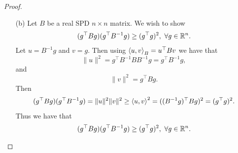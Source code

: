 \documentclass[12pt]{report}
\begin{document}
\begin{problem}
\begin{proof}
\begin{enumerate}
    \item [(b)] Let $B$ be a real SPD $n\times n $ matrix. We wish to show
    \[
         (g^\top B g)(g^\top B^{-1} g) \geq (g^\top g)^2, ~\forall g \in {\mathbb R}^n.
    \]
    Let $u = B^{-1}g$ and $v = g$. Then using ${\left\langle u,v\right\rangle}_B = u^\top B v$ we have that
    \begin{equation*}
        \|u\|^2 = g^\top B^{-1}BB^{-1}g = g^\top B^{-1}g,
    \end{equation*}
    and
    \begin{equation*}
        \|v\|^2 = g^\top B g. 
    \end{equation*}
    Then 
    \begin{equation*}
        (g^\top B g)(g^\top B^{-1} g) = \|u\|^2\|v\|^2 \geq {\left\langle u,v\right\rangle}^2 = ((B^{-1}g)^\top Bg)^2 = (g^\top g)^2.
    \end{equation*}
    Thus we have that
    \begin{equation*}
        (g^\top B g)(g^\top B^{-1} g) \geq (g^\top g)^2, ~\forall g \in {\mathbb R}^n.
    \end{equation*}
    

    

\end{enumerate}

\end{proof}
\end{problem}

\end{document}
